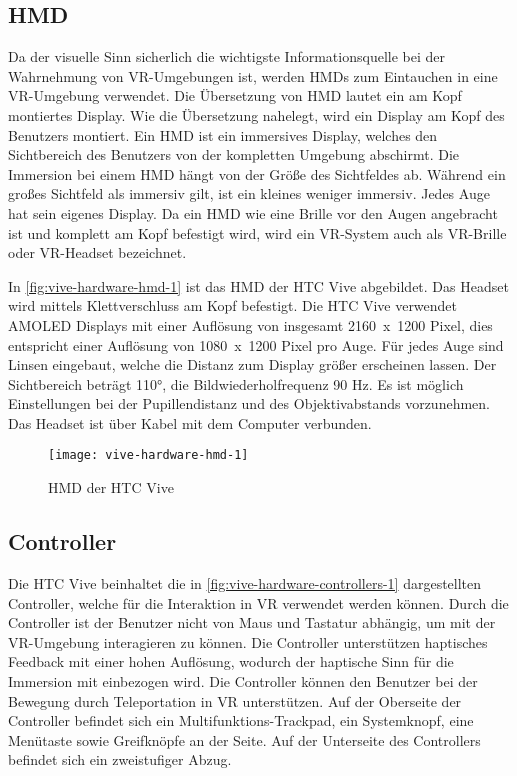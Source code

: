 \subsection{\acl{HMD}}
Da der visuelle Sinn \glqq sicherlich die wichtigste Informationsquelle bei der Wahrnehmung\grqq \cite{DoernerWahrnehmung} von \ac{VR}-Umgebungen ist, werden \ac{HMD}s zum Eintauchen in eine \ac{VR}-Umgebung verwendet. Die Übersetzung von \ac{HMD} lautet \glqq ein am Kopf montiertes Display\grqq. Wie die Übersetzung nahelegt, wird ein Display am Kopf des Benutzers montiert. Ein \ac{HMD} ist ein immersives Display, welches den Sichtbereich des Benutzers von der kompletten Umgebung abschirmt. Die Immersion bei einem \ac{HMD} hängt von der Größe des Sichtfeldes ab. Während ein großes Sichtfeld als immersiv gilt, ist ein kleines weniger immersiv. \cite{Doerner2019} Jedes Auge hat sein eigenes Display. Da ein \ac{HMD} wie eine Brille vor den Augen angebracht ist und komplett am Kopf befestigt wird, wird ein \ac{VR}-System auch als \ac{VR}-Brille oder \ac{VR}-Headset bezeichnet.

In \autoref{fig:vive-hardware-hmd-1} ist das \ac{HMD} der HTC Vive abgebildet. Das Headset wird mittels Klettverschluss am Kopf befestigt. Die HTC Vive verwendet \acs{AMOLED} Displays mit einer Auflösung von insgesamt \mbox{2160 x 1200} Pixel, dies entspricht einer Auflösung von \mbox{1080 x 1200} Pixel pro Auge. Für jedes Auge sind Linsen eingebaut, welche die Distanz zum Display größer erscheinen lassen. Der Sichtbereich beträgt 110°, die Bildwiederholfrequenz 90 Hz. Es ist möglich Einstellungen bei der Pupillendistanz und des Objektivabstands vorzunehmen. Das Headset ist über Kabel mit dem Computer verbunden. \cite{ViveProduct}

\begin{figure}[!htbp]
	\centering
	\texttt{[image: vive-hardware-hmd-1]}
	\caption[HMD der HTC Vive]{\acs{HMD} der HTC Vive \cite{ViveHMD}}
	\label{fig:vive-hardware-hmd-1}
\end{figure}

\subsection{Controller}
\label{section:controller}
Die HTC Vive beinhaltet die in \autoref{fig:vive-hardware-controllers-1} dargestellten Controller, welche für die Interaktion in \ac{VR} verwendet werden können. Durch die Controller ist der Benutzer nicht von Maus und Tastatur abhängig, um mit der \ac{VR}-Umgebung interagieren zu können. Die Controller unterstützen haptisches Feedback mit einer hohen Auflösung, wodurch der haptische Sinn für die Immersion mit einbezogen wird. Die Controller können den Benutzer bei der Bewegung durch Teleportation in \ac{VR} unterstützen. Auf der Oberseite der Controller befindet sich ein Multifunktions-Trackpad, ein Systemknopf, eine Menütaste sowie Greifknöpfe an der Seite. Auf der Unterseite des Controllers befindet sich ein zweistufiger Abzug. \cite{ViveProduct}


